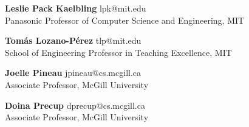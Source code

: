 \documentclass[line,margin,letterpaper]{res}
\begin{document}
\begin{resume}
\textbf{Leslie Pack Kaelbling} {\small lpk@mit.edu}\\
Panasonic Professor of Computer Science and Engineering, MIT

\textbf{Tom\'{a}s Lozano-P\'{e}rez} {\small tlp@mit.edu}\\
School of Engineering Professor in Teaching Excellence, MIT

\textbf{Joelle Pineau} {\small jpineau@cs.mcgill.ca}\\
Associate Professor, McGill University

\textbf{Doina Precup} {\small dprecup@cs.mcgill.ca}\\
Associate Professor, McGill University
\fi
\end{resume}
\end{document}
